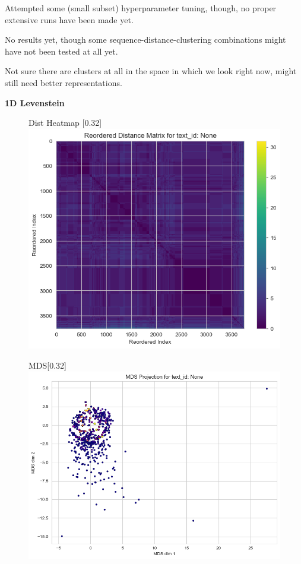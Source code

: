 \documentclass{article}
\begin{document}
Attempted some (small subset) hyperparameter tuning, though, no proper extensive runs have been made yet.

No results yet, though some sequence-distance-clustering combinations might have not been tested at all yet.

Not sure there are clusters at all in the space in which we look right now, might still need better representations. 

\textbf{1D Levenstein}
\begin{figure}[H]
  \centering
  \begin{subcaptionbox}{Dist Heatmap \label{fig:sl_a}}[0.32\textwidth]
    {\centering\includegraphics[width=\linewidth]{plots/cluster_examples/hdbs_500examples_lev1D_trimmed_Boxplot.png}}
  \end{subcaptionbox}
  \hfill
  \begin{subcaptionbox}{MDS\label{fig:sl_b}}[0.32\textwidth]
    {\centering\includegraphics[width=\linewidth]{plots/cluster_examples/hdbs_500examples_lev1D_trimmed_MDS.png}}

\end{subcaptionbox}
\end{figure}
\end{document}
